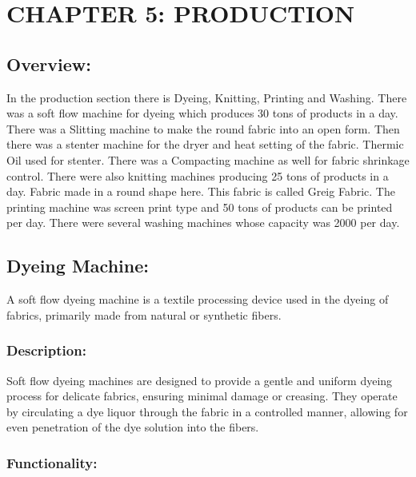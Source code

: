\section{CHAPTER 5: PRODUCTION}

\subsection{Overview:}

In the production section there is Dyeing, Knitting, Printing and Washing. There
was a soft flow machine for dyeing which produces 30 tons of products in
a day. There was a Slitting machine to make the round fabric into an
open form. Then there was a stenter machine for the dryer and heat
setting of the fabric. Thermic Oil used for stenter. There was a
Compacting machine as well for fabric shrinkage control. There were also
knitting machines producing 25 tons of products in a day. Fabric made in
a round shape here. This fabric is called Greig Fabric. The printing
machine was screen print type and 50 tons of products can be printed per
day. There were several washing machines whose capacity was 2000 per
day.


\subsection{Dyeing Machine:}

A soft flow dyeing machine is a textile processing device used in the
dyeing of fabrics, primarily made from natural or synthetic fibers.

\subsubsection{Description:}


Soft flow dyeing machines are designed to provide a gentle and uniform
dyeing process for delicate fabrics, ensuring minimal damage or
creasing. They operate by circulating a dye liquor through the fabric in
a controlled manner, allowing for even penetration of the dye solution
into the fibers.


\subsubsection{Functionality:}

